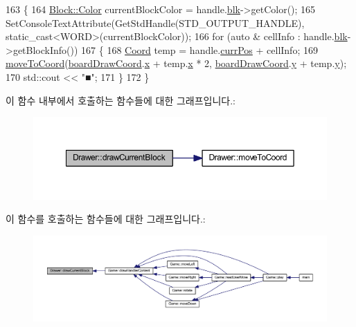 \begin{DoxyCode}
163     \{
164         \mbox{\hyperlink{class_block_ad054b4ac51df79aa910040b2a2fdf7b5}{Block::Color}} currentBlockColor = handle.\mbox{\hyperlink{class_block_handler_ab57212ded2552ab5559d278c8538c454}{blk}}->getColor();
165         SetConsoleTextAttribute(GetStdHandle(STD\_OUTPUT\_HANDLE), static\_cast<WORD>(currentBlockColor));
166         \textcolor{keywordflow}{for} (\textcolor{keyword}{auto} & cellInfo : handle.\mbox{\hyperlink{class_block_handler_ab57212ded2552ab5559d278c8538c454}{blk}}->getBlockInfo())
167         \{
168             \mbox{\hyperlink{struct_coord}{Coord}} temp = handle.\mbox{\hyperlink{class_block_handler_a11bd634fdc179446f9c6751e2394999e}{currPos}} + cellInfo;
169             \mbox{\hyperlink{class_drawer_ac1a96e007c07cab2e36a7c78484ee9a6}{moveToCoord}}(\mbox{\hyperlink{tetris__drawer_8h_afe5fa4d0ad1820f448b83de84142af4d}{boardDrawCoord}}.\mbox{\hyperlink{struct_coord_a696eaa744360fc791d0e3b331c549dbe}{x}} + temp.\mbox{\hyperlink{struct_coord_a696eaa744360fc791d0e3b331c549dbe}{x}} * 2, 
      \mbox{\hyperlink{tetris__drawer_8h_afe5fa4d0ad1820f448b83de84142af4d}{boardDrawCoord}}.\mbox{\hyperlink{struct_coord_a214166cca70cef7dda9201689c3e81ab}{y}} + temp.\mbox{\hyperlink{struct_coord_a214166cca70cef7dda9201689c3e81ab}{y}});
170             std::cout << \textcolor{stringliteral}{"■"};
171         \}
172     \}
\end{DoxyCode}
이 함수 내부에서 호출하는 함수들에 대한 그래프입니다.\+:
\nopagebreak
\begin{figure}[H]
\begin{center}
\leavevmode
\includegraphics[width=350pt]{class_drawer_acef9be5772c0a3bdbae4f01d851e60f1_cgraph}
\end{center}
\end{figure}
이 함수를 호출하는 함수들에 대한 그래프입니다.\+:
\nopagebreak
\begin{figure}[H]
\begin{center}
\leavevmode
\includegraphics[width=350pt]{class_drawer_acef9be5772c0a3bdbae4f01d851e60f1_icgraph}
\end{center}
\end{figure}
\mbox{\label{class_drawer_a9f5e10f6175710be253244d6f80ebcf7}} 
